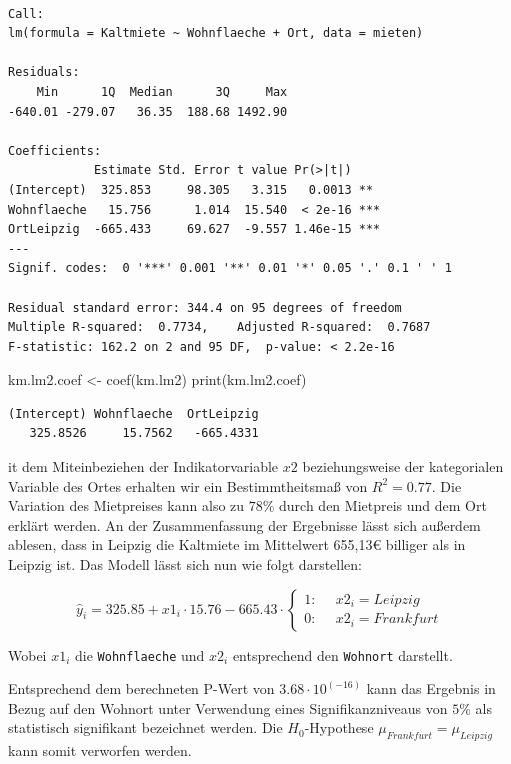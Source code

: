 \documentclass[
  a4paper,
  DIV=11]{scrartcl}
\newenvironment{Shaded}{\begin{snugshade}}{\end{snugshade}}
\newcommand{\FunctionTok}[1]{\textcolor[rgb]{0.28,0.35,0.67}{#1}}
\newcommand{\NormalTok}[1]{\textcolor[rgb]{0.00,0.23,0.31}{#1}}
\newcommand{\OtherTok}[1]{\textcolor[rgb]{0.00,0.23,0.31}{#1}}
\begin{document}
\begin{verbatim}

Call:
lm(formula = Kaltmiete ~ Wohnflaeche + Ort, data = mieten)

Residuals:
    Min      1Q  Median      3Q     Max 
-640.01 -279.07   36.35  188.68 1492.90 

Coefficients:
            Estimate Std. Error t value Pr(>|t|)    
(Intercept)  325.853     98.305   3.315   0.0013 ** 
Wohnflaeche   15.756      1.014  15.540  < 2e-16 ***
OrtLeipzig  -665.433     69.627  -9.557 1.46e-15 ***
---
Signif. codes:  0 '***' 0.001 '**' 0.01 '*' 0.05 '.' 0.1 ' ' 1

Residual standard error: 344.4 on 95 degrees of freedom
Multiple R-squared:  0.7734,    Adjusted R-squared:  0.7687 
F-statistic: 162.2 on 2 and 95 DF,  p-value: < 2.2e-16
\end{verbatim}

\begin{Shaded}
\begin{Highlighting}[]
\NormalTok{km.lm2.coef }\OtherTok{\textless{}{-}} \FunctionTok{coef}\NormalTok{(km.lm2)}
\FunctionTok{print}\NormalTok{(km.lm2.coef)}
\end{Highlighting}
\end{Shaded}

\begin{verbatim}
(Intercept) Wohnflaeche  OrtLeipzig 
   325.8526     15.7562   -665.4331 
\end{verbatim}

it dem Miteinbeziehen der Indikatorvariable \(x2\) beziehungsweise der
kategorialen Variable des Ortes erhalten wir ein Bestimmtheitsmaß von
\(R^2 = 0.77\). Die Variation des Mietpreises kann also zu \(78\)\%
durch den Mietpreis und dem Ort erklärt werden. An der Zusammenfassung
der Ergebnisse lässt sich außerdem ablesen, dass in Leipzig die
Kaltmiete im Mittelwert 655,13€ billiger als in Leipzig ist. Das Modell
lässt sich nun wie folgt darstellen:

\[ 
\hat{y}_i = 
325.85 
+ x1_i \cdot 
15.76
-665.43 \cdot 
\begin{cases} 
\text{1}: & \text{ $x2_i = Leipzig$}\\
\text{0}: & \text{ $x2_i = Frankfurt$}
\end{cases} 
\]

Wobei \(x1_i\) die \texttt{Wohnflaeche} und \(x2_i\) entsprechend den
\texttt{Wohnort} darstellt.

Entsprechend dem berechneten P-Wert von \(3.68 \cdot 10^(-16)\) kann das
Ergebnis in Bezug auf den Wohnort unter Verwendung eines
Signifikanzniveaus von \(5\%\) als statistisch signifikant bezeichnet
werden. Die \(H_0\)-Hypothese \(\mu_{Frankfurt} = \mu_{Leipzig}\) kann
somit verworfen werden.
\end{document}

